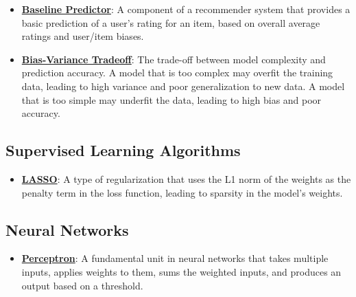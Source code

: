 \documentclass{article}%
\begin{document}
\begin{itemize}[leftmargin=*]
\item \href{https://www.math.purdue.edu/~yipn/351/11L2-svd-pca-recommender.pdf#page=42}{\textbf{Baseline Predictor}}: A component of a recommender system that provides a basic prediction of a user's rating for an item, based on overall average ratings and user/item biases.%
\item \href{https://www.math.purdue.edu/~yipn/351/11L2-svd-pca-recommender.pdf#page=53}{\textbf{Bias-Variance Tradeoff}}: The trade-off between model complexity and prediction accuracy. A model that is too complex may overfit the training data, leading to high variance and poor generalization to new data. A model that is too simple may underfit the data, leading to high bias and poor accuracy.%
\end{itemize}

%
\subsection{Supervised Learning Algorithms}%
\label{subsec:SupervisedLearningAlgorithms}%
\begin{itemize}[leftmargin=*]%
\item \href{https://www.math.purdue.edu/~yipn/351/10L1-CrossValidation.pdf#page=17}{\textbf{LASSO}}: A type of regularization that uses the L1 norm of the weights as the penalty term in the loss function, leading to sparsity in the model's weights.%
\end{itemize}

%
\subsection{Neural Networks}%
\label{subsec:NeuralNetworks}%
\begin{itemize}[leftmargin=*]%
\item \href{https://www.math.purdue.edu/~yipn/351/02L2-Intro.pdf#page=45}{\textbf{Perceptron}}: A fundamental unit in neural networks that takes multiple inputs, applies weights to them, sums the weighted inputs, and produces an output based on a threshold.%
\end{itemize}

%
\end{document}
